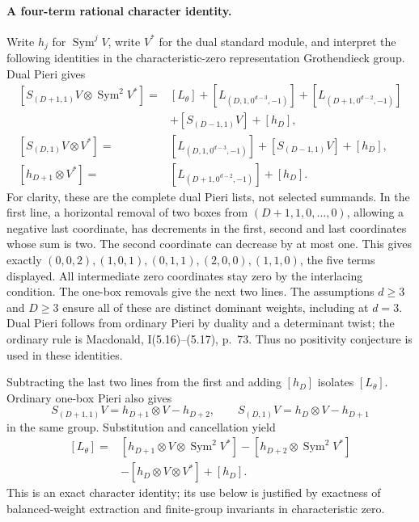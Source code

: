 \paragraph{A four-term rational character identity.}
Write \(h_j\) for \(\operatorname{Sym}^j V\),
write \(V^*\) for the dual standard module, and interpret
the following identities in the characteristic-zero
representation Grothendieck group. Dual Pieri gives
\[
\begin{split}
 [S_{(D+1,1)}V\otimes\operatorname{Sym}^2V^*]
  ={}&[L_\theta]
       +[L_{(D,1,0^{d-3},-1)}]
       +[L_{(D+1,0^{d-2},-1)}]\\
     &+[S_{(D-1,1)}V]+[h_D],\\
 [S_{(D,1)}V\otimes V^*]
  ={}&[L_{(D,1,0^{d-3},-1)}]
       +[S_{(D-1,1)}V]+[h_D],\\
 [h_{D+1}\otimes V^*]
  ={}&[L_{(D+1,0^{d-2},-1)}]+[h_D].
\end{split}\tag{F-024.4}
\]
For clarity, these are the complete dual Pieri lists, not
selected summands. In the first line, a horizontal removal
of two boxes from \((D+1,1,0,\ldots,0)\), allowing a
negative last coordinate, has decrements in the first,
second and last coordinates whose sum is two. The second
coordinate can decrease by at most one. This gives exactly
\((0,0,2),(1,0,1),(0,1,1),(2,0,0),(1,1,0)\),
the five terms displayed. All intermediate zero coordinates
stay zero by the interlacing condition. The one-box removals
give the next two lines. The assumptions \(d\geq3\) and
\(D\geq3\) ensure all of these are distinct dominant
weights, including at \(d=3\).
Dual Pieri follows from ordinary Pieri by duality and a
determinant twist; the ordinary rule is Macdonald, I(5.16)--(5.17),
p.~73. Thus no positivity conjecture is used in these identities.

Subtracting the last two lines from the first and adding
\([h_D]\) isolates \([L_\theta]\). Ordinary one-box
Pieri also gives
\[
 S_{(D+1,1)}V=h_{D+1}\otimes V-h_{D+2},\qquad
 S_{(D,1)}V=h_D\otimes V-h_{D+1}
\]
in the same group. Substitution and cancellation yield
\begin{equation}\label{eq:F024character}
 \begin{split}
 [L_\theta]
  ={}&[h_{D+1}\otimes V\otimes\operatorname{Sym}^2V^*]
   -[h_{D+2}\otimes\operatorname{Sym}^2V^*]\\
   &-[h_D\otimes V\otimes V^*]+[h_D].
 \end{split}
\end{equation}
This is an exact character identity; its use below is
justified by exactness of balanced-weight extraction and
finite-group invariants in characteristic zero.

